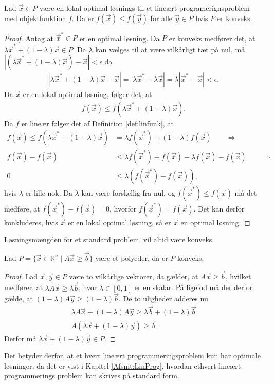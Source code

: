 \begin{stn}
Lad $\vec{x} \in P$ være en lokal optimal løsnings til et lineært programerignsproblem  med objektfunktion $f$.
Da er  $f(\vec{x}) \leq f(\vec{y})$ for alle $\vec{y} \in P$ hvis $P$ er konveks.
\end{stn}
\begin{proof}
Antag at $\vec{x}^* \in P$ er en optimal løsning.
Da $P$ er konveks medfører det, at $\lambda \vec{x}^* + (1-\lambda)\vec{x} \in P$. 
Da $\lambda$ kan vælges til at være vilkårligt tæt på nul, må $|(\lambda \vec{x}^* + (1-\lambda)\vec{x}) - \vec{x}| < \epsilon$ da
\begin{align*}
 |\lambda \vec{x}^* + (1-\lambda)\vec{x} - \vec{x}| = | \lambda \vec{x}^* - \lambda\vec{x}| = \lambda|\vec{x}^* - \vec{x}| < \epsilon.
\end{align*}
Da $\vec{x}$ er en lokal optimal løsning, følger det, at
\begin{align*}
f(\vec{x}) \leq f(\lambda \vec{x}^* + (1-\lambda)\vec{x}).
\end{align*}
Da $f$ er lineær følger det af Definition \ref{def:linfunk}, at 
\begin{align*}
f(\vec{x}) \leq f(\lambda \vec{x}^* + (1-\lambda)\vec{x}) &= \lambda f(\vec{x}^*) + (1-\lambda)f(\vec{x}) \qquad \Rightarrow
\\ f(\vec{x}) - f(\vec{x}) &\leq \lambda f(\vec{x}^*) + f(\vec{x})-\lambda f(\vec{x}) - f(\vec{x}) \qquad \Rightarrow
\\ 0 & \leq \lambda( f(\vec{x}^*) - f(\vec{x})),
\end{align*}
hvis $\lambda$ er lille nok.
Da $ \lambda$ kan være forskellig fra nul, og $f(\vec{x}^*)\leq f(\vec{x})$ må det medføre, at $f(\vec{x}^*) - f(\vec{x}) = 0$, hvorfor $f(\vec{x}^*) =f(\vec{x})$. 
Det kan derfor konkluderes, hvis $\vec{x}$ er en lokal optimal løsning, så er $\vec{x}$ en optimal løsning.
\end{proof}
Løsningsmængden  for et standard problem, vil altid være konveks.
\begin{stn}
Lad $P =\{ \vec{x} \in \mathds{R}^n \mid A \vec{x} \geq \vec{b}\} $ være et polyeder, da er $P$ konveks.
\label{stn:polykon}
\end{stn}
\begin{proof}
Lad $\vec{x}, \vec{y} \in P$ være to vilkårlige vektorer, da gælder, at $A\vec{x} \geq \vec{b}$, hvilket medfører, at $\lambda A \vec{x} \geq \lambda\vec{b}$, hvor $\lambda \in [0,1]$ er en skalar. 
På ligefod må der derfor gælde, at $(1-\lambda)A\vec{y} \geq (1-\lambda)\vec{b}$.
De to uligheder adderes nu
\begin{align*}
\lambda A \vec{x} + (1-\lambda) A \vec{y} \geq \lambda \vec{b} + (1 - \lambda) \vec{b}
\\  A (\lambda\vec{x} + (1-\lambda)\vec{y}) \geq \vec{b}.
\end{align*}
Derfor må $\lambda\vec{x} + (1-\lambda)\vec{y} \in P$.
\end{proof}
Det betyder derfor, at et hvert lineært programmeringsproblem kun har optimale løsninger, da det er vist i Kapitel \ref{Afsnit:LinProg}, hvordan ethvert lineært programmerings problem kan skrives på standard form.

